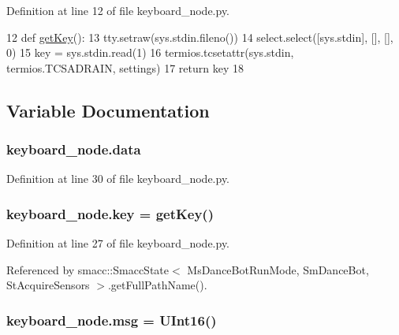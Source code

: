 Definition at line 12 of file keyboard\+\_\+node.\+py.


\begin{DoxyCode}
12 \textcolor{keyword}{def }\hyperlink{namespacekeyboard__node_a14d63e075186fe8cedf60ed3524811f5}{getKey}():
13     tty.setraw(sys.stdin.fileno())
14     select.select([sys.stdin], [], [], 0)
15     key = sys.stdin.read(1)
16     termios.tcsetattr(sys.stdin, termios.TCSADRAIN, settings)
17     \textcolor{keywordflow}{return} key
18 
\end{DoxyCode}


\subsection{Variable Documentation}
\subsubsection[{\texorpdfstring{data}{data}}]{\setlength{\rightskip}{0pt plus 5cm}keyboard\+\_\+node.\+data}\hypertarget{namespacekeyboard__node_a33f8346a3ffb7a9fef12da96e958f14e}{}\label{namespacekeyboard__node_a33f8346a3ffb7a9fef12da96e958f14e}


Definition at line 30 of file keyboard\+\_\+node.\+py.

\subsubsection[{\texorpdfstring{key}{key}}]{\setlength{\rightskip}{0pt plus 5cm}keyboard\+\_\+node.\+key = {\bf get\+Key}()}\hypertarget{namespacekeyboard__node_aec12217d2be0bbc768f52b63b0673925}{}\label{namespacekeyboard__node_aec12217d2be0bbc768f52b63b0673925}


Definition at line 27 of file keyboard\+\_\+node.\+py.



Referenced by smacc\+::\+Smacc\+State$<$ Ms\+Dance\+Bot\+Run\+Mode, Sm\+Dance\+Bot, St\+Acquire\+Sensors $>$.\+get\+Full\+Path\+Name().

\subsubsection[{\texorpdfstring{msg}{msg}}]{\setlength{\rightskip}{0pt plus 5cm}keyboard\+\_\+node.\+msg = U\+Int16()}\hypertarget{namespacekeyboard__node_a768777e12f75b89e4a0a60acf748e9eb}{}\label{namespacekeyboard__node_a768777e12f75b89e4a0a60acf748e9eb}


